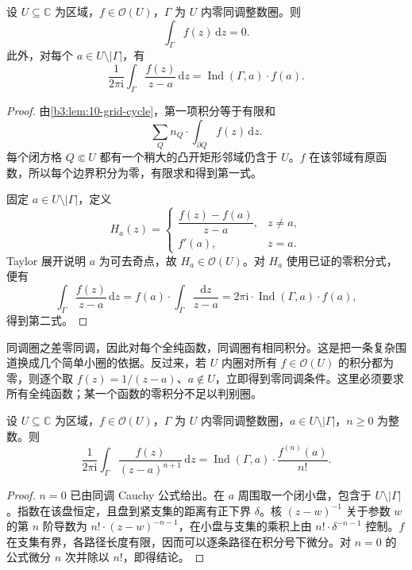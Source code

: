 \begin{theorem}\label{b3:thm:10-cauchy-homology}
设 \(U\subseteq\mathbb C\) 为区域，\(f\in\mathcal O(U)\)，\(\Gamma\) 为 \(U\) 内零同调整数圈。则
\[
 \int_\Gamma f(z)\,\mathrm dz=0.
\]
此外，对每个 \(a\in U\setminus|\Gamma|\)，有
\[
 \frac1{2\pi\mathrm i}\int_\Gamma\frac{f(z)}{z-a}\,\mathrm dz
 =\operatorname{Ind}(\Gamma,a)\cdot f(a).
\]
\end{theorem}
\begin{proof}
由\cref{b3:lem:10-grid-cycle}，第一项积分等于有限和
\[
 \sum_Q n_Q\cdot\int_{\partial Q}f(z)\,\mathrm dz.
\]
每个闭方格 \(Q\Subset U\) 都有一个稍大的凸开矩形邻域仍含于 \(U\)。\(f\) 在该邻域有原函数，所以每个边界积分为零，有限求和得到第一式。

固定 \(a\in U\setminus|\Gamma|\)，定义
\[
 H_a(z)=
 \begin{cases}
 \dfrac{f(z)-f(a)}{z-a},&z\ne a,\\
 f'(a),&z=a.
 \end{cases}
\]
Taylor 展开说明 \(a\) 为可去奇点，故 \(H_a\in\mathcal O(U)\)。对 \(H_a\) 使用已证的零积分式，便有
\[
 \int_\Gamma\frac{f(z)}{z-a}\,\mathrm dz
 =f(a)\cdot\int_\Gamma\frac{\mathrm dz}{z-a}
 =2\pi\mathrm i\cdot\operatorname{Ind}(\Gamma,a)\cdot f(a),
\]
得到第二式。
\end{proof}

同调圈之差零同调，因此对每个全纯函数，同调圈有相同积分。这是把一条复杂围道换成几个简单小圈的依据。反过来，若 \(U\) 内圈对所有 \(f\in\mathcal O(U)\) 的积分都为零，则逐个取 \(f(z)=1/(z-a)\)、\(a\notin U\)，立即得到零同调条件。这里必须要求所有全纯函数；某一个函数的零积分不足以判别圈。

\begin{corollary}[高阶同调积分公式]\label{b3:cor:10-higher-cauchy}
设 \(U\subseteq\mathbb C\) 为区域，\(f\in\mathcal O(U)\)，\(\Gamma\) 为 \(U\) 内零同调整数圈，\(a\in U\setminus|\Gamma|\)，\(n\ge0\) 为整数。则
\[
 \frac1{2\pi\mathrm i}\int_\Gamma
 \frac{f(z)}{(z-a)^{n+1}}\,\mathrm dz
 =\operatorname{Ind}(\Gamma,a)\cdot\frac{f^{(n)}(a)}{n!}.
\]
\end{corollary}
\begin{proof}
\(n=0\) 已由同调 Cauchy 公式给出。在 \(a\) 周围取一个闭小盘，包含于 \(U\setminus|\Gamma|\)。指数在该盘恒定，且盘到紧支集的距离有正下界 \(\delta\)。核 \((z-w)^{-1}\) 关于参数 \(w\) 的第 \(n\) 阶导数为 \(n!\cdot(z-w)^{-n-1}\)，在小盘与支集的乘积上由 \(n!\cdot\delta^{-n-1}\) 控制。\(f\) 在支集有界，各路径长度有限，因而可以逐条路径在积分号下微分。对 \(n=0\) 的公式微分 \(n\) 次并除以 \(n!\)，即得结论。
\end{proof}

